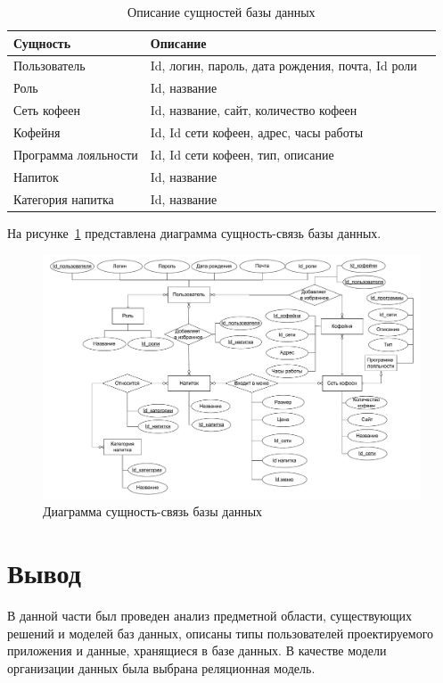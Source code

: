 \begin{table}[ht]
	\begin{center}
		\begin{threeparttable}
			\caption{\label{er_descr} Описание сущностей базы данных}
			\begin{tabular}{|p{6cm}|p{10cm}|c|}
				\hline
				\textbf{Сущность} & \textbf{Описание}  \\ \hline
				Пользователь & Id, логин, пароль, дата рождения, почта, Id роли\\ \hline
				Роль & Id, название\\ \hline
				Сеть кофеен & Id, название, сайт, количество кофеен\\ \hline
				Кофейня & Id, Id сети кофеен, адрес, часы работы\\ \hline
				Программа лояльности & Id, Id сети кофеен, тип, описание\\ \hline
				Напиток & Id, название\\ \hline
				Категория напитка & Id, название\\ \hline
			\end{tabular}
		\end{threeparttable}
	\end{center}
\end{table}

На рисунке~\ref{er_img} представлена диаграмма сущность-связь базы данных.


\begin{figure}[H]
	\centering
	\includegraphics[width=1\linewidth]{img/er_last.pdf}
	\caption{Диаграмма сущность-связь базы данных}
	\label{er_img}
\end{figure}


\section*{Вывод}
В данной части был проведен анализ предметной области, существующих решений и моделей баз данных, описаны типы пользователей проектируемого приложения и данные, хранящиеся в базе данных. В качестве модели организации данных была выбрана реляционная модель.


